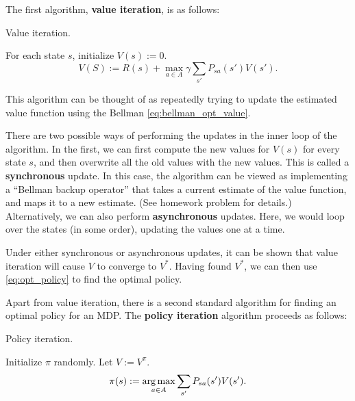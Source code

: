The first algorithm, \textbf{value iteration}, is as follows:
\begin{algorithm}[ht]
    \caption{Value iteration.}
    \label{alg:vi}
    \begin{algorithmic}
    \State For each state $s$, initialize $V(s) := 0$.
    \Repeat
            \State \begin{equation}\label{eq:value_iteration}
                V(S) := R(s) + \max_{a \in A} \gamma \sum_{s'} P_{sa}(s') V(s').
            \end{equation}
        \EndFor
    \end{algorithmic}
\end{algorithm}

This algorithm can be thought of as repeatedly trying to update the
estimated value function using the Bellman \cref{eq:bellman_opt_value}.

There are two possible ways of performing the updates in the inner loop
of the algorithm. In the first, we can first compute the new values for $V(s)$ for
every state $s$, and then overwrite all the old values with the new values. This
is called a \textbf{synchronous} update. In this case, the algorithm can be viewed as
implementing a ``Bellman backup operator'' that takes a current estimate of
the value function, and maps it to a new estimate. (See homework problem
for details.) Alternatively, we can also perform \textbf{asynchronous} updates.
Here, we would loop over the states (in some order), updating the values one
at a time.

Under either synchronous or asynchronous updates, it can be shown that
value iteration will cause $V$ to converge to $V^*$. Having found $V^*$, we can
then use \cref{eq:opt_policy} to find the optimal policy.

Apart from value iteration, there is a second standard algorithm for
finding an optimal policy for an MDP. The \textbf{policy iteration} algorithm proceeds
as follows:
\begin{algorithm}[ht]
    \caption{Policy iteration.}
    \label{alg:pi}
    \begin{algorithmic}
    \State Initialize $\pi$ randomly.
    \Repeat
        \State Let $V := V^\pi$. 
            \State \begin{equation}
                \pi(s) := \argmax_{a \in A} \sum_{s'} P_{sa}(s')V(s').
            \end{equation}
        \EndFor
    \end{algorithmic}
\end{algorithm}

